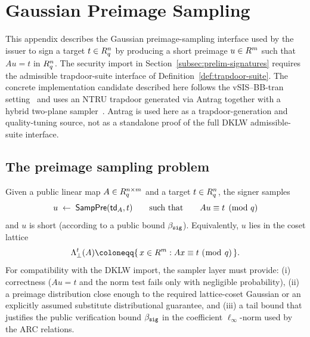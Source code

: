 \section{Gaussian Preimage Sampling}
\label{app:gaussian-sampler}

This appendix describes the Gaussian preimage-sampling interface used by the issuer to sign a target
\(t\in R_q^n\) by producing a short preimage \(u\in R^m\) such that \(A u = t\) in \(R_q^n\).  The security
import in Section~\ref{subsec:prelim-signatures} requires the admissible trapdoor-suite interface of
Definition~\ref{def:trapdoor-suite}.  The concrete implementation candidate described here follows the
vSIS--BB-tran setting~\cite{EPRINT:DKLW25} and uses an NTRU trapdoor generated via Antrag together with
a hybrid two-plane sampler~\cite{EPRINT:ENSTW23}.  Antrag is used here as a trapdoor-generation and
quality-tuning source, not as a standalone proof of the full DKLW admissible-suite interface.

\subsection{The preimage sampling problem}
Given a public linear map \(A\in R_q^{n\times m}\) and a target \(t\in R_q^n\), the signer samples
\[
  u \;\gets\; \mathsf{SampPre}(\mathsf{td}_A,t)
  \qquad\text{such that}\qquad
  A u \equiv t \pmod q
\]
and \(u\) is short (according to a public bound \(\beta_{\mathtt{sig}}\)). Equivalently, \(u\) lies in the coset lattice
\[
  \Lambda_{\perp}^{t}(A)\coloneqq \{\,x\in\R^{m} : A x \equiv t\ (\bmod\ q)\,\}.
\]
For compatibility with the DKLW import, the sampler layer must provide:
(i) correctness (\(Au=t\) and the norm test fails only with negligible probability),
(ii) a preimage distribution close enough to the required lattice-coset Gaussian or an explicitly assumed
substitute distributional guarantee,
and (iii) a tail bound that justifies the public verification bound \(\beta_{\mathtt{sig}}\) in the coefficient
\(\ell_\infty\)-norm used by the ARC relations.

